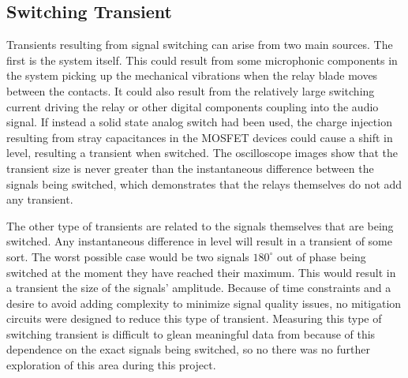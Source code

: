 	\subsection{Switching Transient}

	Transients resulting from signal switching can arise from two main sources. The first is the system itself.  This could result from some microphonic components in the system picking up the mechanical vibrations when the relay blade moves between the contacts. It could also result from the relatively large switching current driving the relay or other digital components coupling into the audio signal. If instead a solid state analog switch had been used, the charge injection resulting from stray capacitances in the MOSFET devices could cause a shift in level, resulting a transient when switched.  The oscilloscope images show that the transient size is never greater than the instantaneous difference between the signals being switched, which demonstrates that the relays themselves do not add any transient.

	The other type of transients are related to the signals themselves that are being switched.  Any instantaneous difference in level will result in a transient of some sort.  The worst possible case would be two signals $180^\circ$ out of phase being switched at the moment they have reached their maximum.  This would result in a transient the size of the signals' amplitude.  Because of time constraints and a desire to avoid adding complexity to minimize signal quality issues, no mitigation circuits were designed to reduce this type of transient.  Measuring this type of switching transient is difficult to glean meaningful data from because of this dependence on the exact signals being switched, so no there was no further exploration of this area during this project.